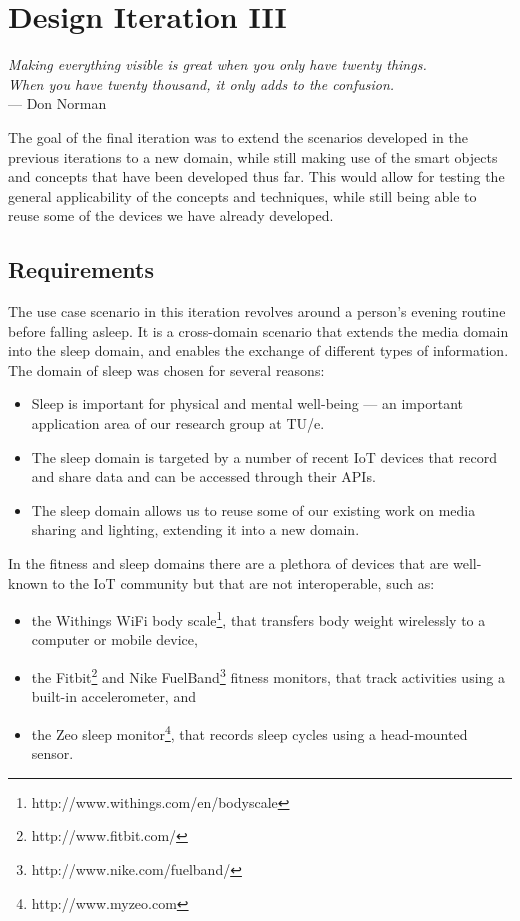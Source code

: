 \chapter{Design Iteration III}
\label{DesignIteration3}

\begin{flushright}{\slshape    
Making everything visible is great when you only have twenty things. \\
When you have twenty thousand, it only adds to the confusion.} \\ \medskip
    ---  Don Norman \cite{Norman1999}
\end{flushright}


The goal of the final iteration was to extend the scenarios developed in the previous iterations to a new domain, while still making use of the smart objects and concepts that have been developed thus far. This would allow for testing the general applicability of the concepts and techniques, while still being able to reuse some of the devices we have already developed.

\section{Requirements}

The use case scenario in this iteration revolves around a person's evening routine before falling asleep. It is a cross-domain scenario that extends the media domain into the sleep domain, and enables the exchange of different types of information. The domain of sleep was chosen for several reasons:

\begin{itemize}
\item Sleep is important for physical and mental well-being --- an important application area of our research group at TU/e.
\item The sleep domain is targeted by a number of recent \ac{IoT} devices that record and share data and can be accessed through their \acp{API}.
\item 	The sleep domain allows us to reuse some of our existing work on media sharing and lighting, extending it into a new domain.
\end{itemize}

In the fitness and sleep domains there are a plethora of devices that are well-known to the \ac{IoT} community but that are not interoperable, such as:

\begin{itemize}
	\item the Withings WiFi body scale\footnote{http://www.withings.com/en/bodyscale}, that transfers body weight wirelessly to a computer or mobile device,
  	\item the Fitbit\footnote{http://www.fitbit.com/} and Nike FuelBand\footnote{http://www.nike.com/fuelband/} fitness monitors, that track activities using a built-in accelerometer, and
	\item the Zeo sleep monitor\footnote{http://www.myzeo.com}, that records sleep cycles using a head-mounted sensor.
\end{itemize}
 

